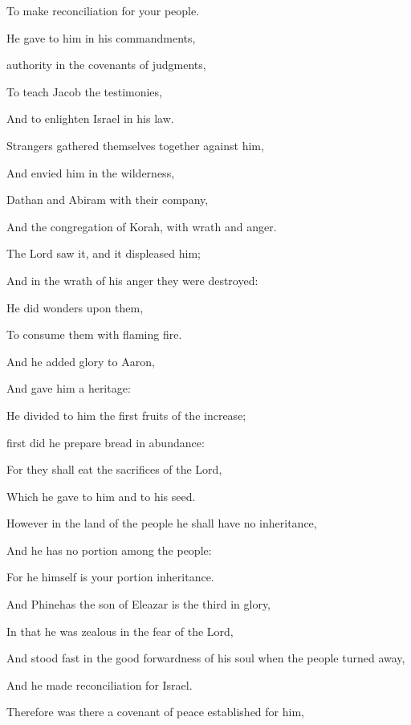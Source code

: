 {\par }{\Q To make reconciliation for your people.
\par }{\Q {}He gave to him in his commandments,
\par }{ authority in the covenants of judgments,
\par }{\Q To teach Jacob the testimonies,
\par }{\Q And to enlighten Israel in his law.
\par }{\Q {}Strangers gathered themselves together against him,
\par }{\Q And envied him in the wilderness,
\par }{ Dathan and Abiram with their company,
\par }{\Q And the congregation of Korah, with wrath and anger.
\par }{\Q {}The Lord saw it, and it displeased him;
\par }{\Q And in the wrath of his anger they were destroyed:
\par }{\Q He did wonders upon them,
\par }{\Q To consume them with flaming fire.
\par }{\Q {}And he added glory to Aaron,
\par }{\Q And gave him a heritage:
\par }{\Q He divided to him the first fruits of the increase;
\par }{ first did he prepare bread in abundance:
\par }{\Q {}For they shall eat the sacrifices of the Lord,
\par }{\Q Which he gave to him and to his seed.
\par }{\Q {}However in the land of the people he shall have no inheritance,
\par }{\Q And he has no portion among the people:
\par }{\Q For he himself is your portion
{} inheritance.
\par }{\BB \par }{\Q {}And Phinehas the son of Eleazar is the third in glory,
\par }{\Q In that he was zealous in the fear of the Lord,
\par }{\Q And stood fast in the good forwardness of his soul when the people turned away,
\par }{\Q And he made reconciliation for Israel.
\par }{\Q {}Therefore was there a covenant of peace established for him,
}
